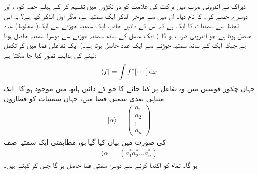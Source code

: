 ڈیراک نے اندرونی ضرب  میں   براکٹ  کی علامت کو دو ٹکڑوں میں تقسیم کر کے پہلے حصہ کو،    ،  اور دوسرے حصے کو ،    کا نام دیا۔ ان میں سے موخر الذکر ایک سمتیہ ہے،  مگر   اول الذکر کیا ہے؟ یہ اس لحاظ سے سمتیات کا ایک  ہے کہ اس کے دائیں جانب ایک سمتیہ جوڑنے سے ایک( مخلوط)  عدد حاصل ہوتا ہے جو اندرونی ضرب ہو گا۔( ایک  عامل کے  ساتھ   سمتیہ جوڑنے سے دوسرا  سمتیہ حاصل ہوتا ہے جبکہ ایک  کے  ساتھ   سمتیہ جوڑنے سے ایک عدد حاصل ہوتا ہے۔) ایک تفاعلی فضا میں  کو تکمل لینے  کی ہدایت تصور کیا جا سکتا ہے:
\begin{align*}
\langle f | = \int f^{*} [ \cdots ] \dif x
\end{align*}
جہاں چکور قوسین   میں وہ تفاعل پر کیا جائے گا جو  کے دائیں ہاتھ      میں  موجود ہو گا۔ ایک متناہی بعدی  سمتی فضا میں، جہاں سمتیات کو قطاروں 
\begin{align}
| \alpha \rangle = \begin{pmatrix}
a_{1} \\ a_{2} \\ \vdots \\ a_{n} 
\end{pmatrix}
\end{align}
کی صورت میں بیان کیا گیا ہو،   مطابقتی  ایک سمتیہ  صف 
\begin{align}
\langle \alpha | = ( a_{1}^{*}a_{2}^{*} \dotsc a_{n}^{*})
\end{align}
ہو گا۔ تمام  کو اکٹھا کرنے سے   دوسرا سمتی فضا حاصل ہو گا جس کو  کہتے ہیں۔ 

